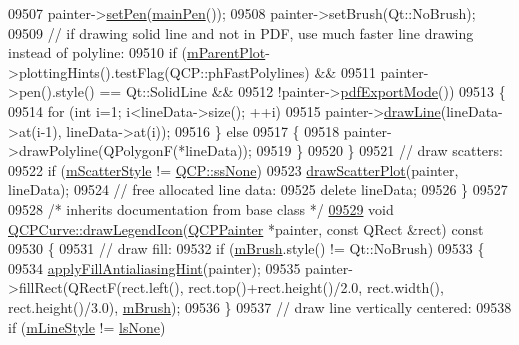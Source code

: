 \begin{DoxyCode}
09507     painter->\hyperlink{a00047_af9c7a4cd1791403901f8c5b82a150195}{setPen}(\hyperlink{a00024_a19276ed2382a3a06464417b8788b1451}{mainPen}());
09508     painter->setBrush(Qt::NoBrush);
09509     \textcolor{comment}{// if drawing solid line and not in PDF, use much faster line drawing instead of polyline:}
09510     \textcolor{keywordflow}{if} (\hyperlink{a00044_aa2a528433e44db02b8aef23c1f9f90ed}{mParentPlot}->plottingHints().testFlag(QCP::phFastPolylines) &&
09511         painter->pen().style() == Qt::SolidLine &&
09512         !painter->\hyperlink{a00047_ac272648ed66f0602f2250de45cbbeb33}{pdfExportMode}())
09513     \{
09514       \textcolor{keywordflow}{for} (\textcolor{keywordtype}{int} i=1; i<lineData->size(); ++i)
09515         painter->\hyperlink{a00047_a0b4b1b9bd495e182c731774dc800e6e0}{drawLine}(lineData->at(i-1), lineData->at(i));
09516     \} \textcolor{keywordflow}{else}
09517     \{  
09518       painter->drawPolyline(QPolygonF(*lineData));
09519     \}
09520   \}
09521   \textcolor{comment}{// draw scatters:}
09522   \textcolor{keywordflow}{if} (\hyperlink{a00028_a5700a112cb679dc983648f67151d5cae}{mScatterStyle} != \hyperlink{a00143_af66d0711d42fe78d96c28abadc67f26fa3ee9f603bc4623e9b98011e8829aad1d}{QCP::ssNone})
09523     \hyperlink{a00028_a45593f30b81beec4b6130b6b53306087}{drawScatterPlot}(painter, lineData);
09524   \textcolor{comment}{// free allocated line data:}
09525   \textcolor{keyword}{delete} lineData;
09526 \}
09527 
09528 \textcolor{comment}{/* inherits documentation from base class */}
\hypertarget{a00115_source_l09529}{}\hyperlink{a00028_a8e9b46de865a9f07cc9d62c904ab8198}{09529} \textcolor{keywordtype}{void} \hyperlink{a00028_a8e9b46de865a9f07cc9d62c904ab8198}{QCPCurve::drawLegendIcon}(\hyperlink{a00047}{QCPPainter} *painter, \textcolor{keyword}{const} QRect &rect)\textcolor{keyword}{
       const}
09530 \textcolor{keyword}{}\{
09531   \textcolor{comment}{// draw fill:}
09532   \textcolor{keywordflow}{if} (\hyperlink{a00024_a33f00674c0161c13315ab9da0895418e}{mBrush}.style() != Qt::NoBrush)
09533   \{
09534     \hyperlink{a00024_ac08a480155895e674dbfe5a5670e0ff3}{applyFillAntialiasingHint}(painter);
09535     painter->fillRect(QRectF(rect.left(), rect.top()+rect.height()/2.0, rect.width(), rect.height()/3.0), 
      \hyperlink{a00024_a33f00674c0161c13315ab9da0895418e}{mBrush});
09536   \}
09537   \textcolor{comment}{// draw line vertically centered:}
09538   \textcolor{keywordflow}{if} (\hyperlink{a00028_ae1f35ae2b15aee8e15bcdfec5be95156}{mLineStyle} != \hyperlink{a00028_a2710e9f79302152cff794c6e16cc01f1aec1601a191cdf0b4e761c4c66092cc48}{lsNone})

\end{DoxyCode}
